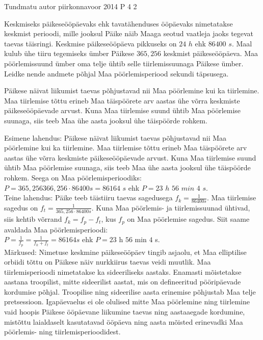 {Tundmatu autor} %
{piirkonnavoor} %
{2014} %
{P 4} %
{2} %
{

\ifStatement
Keskmiseks päikeseööpäevaks ehk tavatähenduses ööpäevaks nimetatakse keskmist perioodi, mille jooksul Päike näib Maaga seotud vaatleja jaoks tegevat taevas täisringi. Keskmise päikeseööpäeva pikkuseks on $24$ $h$ ehk $86 400$ $s$. Maal kulub ühe tiiru tegemiseks ümber Päikese $365,256$ keskmist päikeseööpäeva. Maa pöörlemissuund ümber oma telje ühtib selle tiirlemissuunaga Päikese ümber. Leidke nende andmete põhjal Maa pöörlemisperiood sekundi täpsusega.


\ifHint
Päikese näivat liikumist taevas põhjustavad nii Maa pöörlemine kui ka tiirlemine. Maa tiirlemise tõttu erineb Maa täispöörete arv aastas ühe võrra keskmiste päikeseööpäevade arvust. Kuna Maa tiirlemise suund ühtib Maa pöörlemise suunaga, siis teeb Maa ühe aasta jooksul ühe täispöörde rohkem.
\fi

\ifSolution
Esimene lahendus: Päikese näivat liikumist taevas põhjustavad nii Maa pöörlemine kui ka tiirlemine. Maa tiirlemise tõttu erineb Maa täispöörete arv aastas ühe võrra keskmiste päikeseööpäevade arvust. Kuna Maa tiirlemise suund ühtib Maa pöörlemise suunaga, siis teeb Maa ühe aasta jooksul ühe täispöörde rohkem. Seega on Maa pöörlemisperioodiks: \\
$P=365,256366,256 \cdot 86 400 s =86 164$ $s$  ehk $P= 23$ $h$ $56$ $min$ $4$ $s$.\\
Teine lahendus: Päike teeb täistiiru taevas sagedusega $f_k=\frac{1}{86 400 s}$. Maa tiirlemise sagedus on $f_t = \frac{1}{365,256 \cdot 86400 s}$. Kuna Maa pöörlemis- ja tiirlemissuunad ühtivad, siis kehtib võrrand $f_k = f_p - f_t$, kus $f_p$ on Maa pöörlemise sagedus. Siit saame avaldada Maa pöörlemisperioodi: \\
$P=\frac{1}{f_p} = \frac{1}{f_k + f_t} = 86 164 s$ ehk $P= 23$ h $56$ min $4$ s.\\
Märkused: Nimetuse keskmine päikeseööpäev tingib asjaolu, et Maa elliptilise orbiidi tõttu on Päikese näiv nurkkiirus taevas veidi muutlik. Maa tiirlemisperioodi nimetatakse ka sideeriliseks aastaks. Enamasti mõistetakse aastana troopilist, mitte sideerilist aastat, mis on defineeritud pööripäevade kordumise põhjal. Troopilise ning sideerilise aasta erinemise põhjustab Maa telje pretsessioon. Igapäevaelus ei ole olulised mitte Maa pöörlemine ning tiirlemine vaid hoopis Päikese ööpäevane liikumine taevas ning aastaaegade kordumine, mistõttu laialdaselt kasutatavad ööpäeva ning aasta mõisted erinevadki Maa pöörlemis- ning tiirlemisperioodidest.
\fi
}